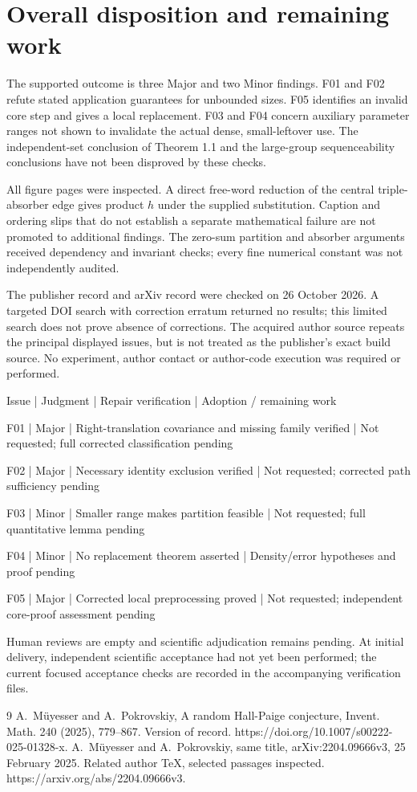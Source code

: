 \documentclass[10pt]{article}
\begin{document}
\section*{Overall disposition and remaining work}
The supported outcome is three Major and two Minor findings. F01 and F02 refute stated application guarantees for unbounded sizes. F05 identifies an invalid core step and gives a local replacement. F03 and F04 concern auxiliary parameter ranges not shown to invalidate the actual dense, small-leftover use. The independent-set conclusion of Theorem 1.1 and the large-group sequenceability conclusions have not been disproved by these checks.\par
All figure pages were inspected. A direct free-word reduction of the central triple-absorber edge gives product \(h\) under the supplied substitution. Caption and ordering slips that do not establish a separate mathematical failure are not promoted to additional findings. The zero-sum partition and absorber arguments received dependency and invariant checks; every fine numerical constant was not independently audited.\par
The publisher record and arXiv record were checked on 26 October 2026. A targeted DOI search with correction erratum returned no results; this limited search does not prove absence of corrections. The acquired author source repeats the principal displayed issues, but is not treated as the publisher’s exact build source. No experiment, author contact or author-code execution was required or performed.\par
Issue | Judgment | Repair verification | Adoption / remaining work\par
F01 | Major | Right-translation covariance and missing family verified | Not requested; full corrected classification pending\par
F02 | Major | Necessary identity exclusion verified | Not requested; corrected path sufficiency pending\par
F03 | Minor | Smaller range makes partition feasible | Not requested; full quantitative lemma pending\par
F04 | Minor | No replacement theorem asserted | Density/error hypotheses and proof pending\par
F05 | Major | Corrected local preprocessing proved | Not requested; independent core-proof assessment pending\par
Human reviews are empty and scientific adjudication remains pending. At initial delivery, independent scientific acceptance had not yet been performed; the current focused acceptance checks are recorded in the accompanying verification files.\par
9 A. Müyesser and A. Pokrovskiy, A random Hall-Paige conjecture, Invent. Math. 240 (2025), 779–867. Version of record. https://doi.org/10.1007/s00222-025-01328-x. A. Müyesser and A. Pokrovskiy, same title, arXiv:2204.09666v3, 25 February 2025. Related author TeX, selected passages inspected. https://arxiv.org/abs/2204.09666v3.\par
\end{document}

